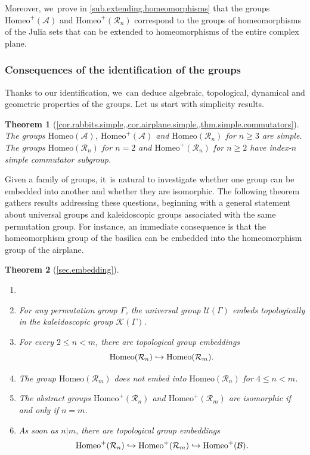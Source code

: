 \documentclass[JEP,XML,SOM,Unicode,NoFloatCountersInSection,published]{cedram}
\newcommand\hto{\mathrel{\lhook\joinrel\to}}
\theoremstyle{plain}
\newtheorem{introtheorem}{Theorem}
\theoremstyle{definition}
\theoremstyle{remark}
\newcommand{\Homeo}{\mathrm{Homeo}}
\newcommand{\A}{\mathcal{A}}
\newcommand{\B}{\mathcal{B}}
\newcommand{\R}{\mathcal{R}}
\newcommand{\K}{\mathcal{K}}
\begin{document}
Moreover, we~prove in \cref{sub.extending.homeomorphisms} that the groups $\Homeo^+(\A)$ and $\Homeo^+(\R_n)$ correspond to the groups of homeomorphisms of the Julia sets that can be extended to homeomorphisms of the entire complex plane.

\subsubsection*{Consequences of the identification of the groups}

Thanks to our identification, we~can deduce algebraic, topological, dynamical and geometric properties of the groups. Let us start with simplicity results.

\begin{introtheorem}[\cref{cor.rabbits.simple,,cor.airplane.simple,,thm.simple.commutators}]
\label{thm.simplicity.results} The groups $\Homeo(\A)$, $\Homeo^+(\A)$ and $\Homeo(\R_n)$ for $n\geq3$ are simple.
The groups $\Homeo(\R_n)$ for $n=2$ and $\Homeo^+(\R_n)$ for $n\geq2$ have index-$n$ simple commutator subgroup.
\end{introtheorem}

Given a family of groups, it~is natural to investigate whether one group can be embedded into another and whether they are isomorphic.
The following theorem gathers results addressing these questions, beginning with a general statement about universal groups and kaleidoscopic groups associated with the same permutation group.
For instance, an immediate consequence is that the homeomorphism group of the basilica can be embedded into the homeomorphism group of the airplane.

\skpt
\begin{introtheorem}[\cref{sec.embedding}]
\label{thm.embeddings.results}
\begin{enumerate}
\item[]
\item For any permutation group $\Gamma$, the universal group $\mathcal{U}(\Gamma)$ embeds topologically in the kaleidoscopic group $\K(\Gamma)$.
\item For every $2 \leq n < m$, there are topological group embeddings
\[
 \Homeo(\R_n) \hto \Homeo(\R_m). 
\]
\item The group $\Homeo(\R_m)$ does not embed into $\Homeo(\R_n)$ for $4 \leq n < m$.
\item The abstract groups $\Homeo^+(\R_n)$ and $\Homeo^+(\R_m)$ are isomorphic if and only if $n=m$.
\item As soon as $n | m$, there are topological group embeddings
\[
 \Homeo^+(\R_n) \hto \Homeo^+(\R_m) \hto \Homeo^+(\B). 
\]
\end{enumerate}
\end{introtheorem}
\end{document}
